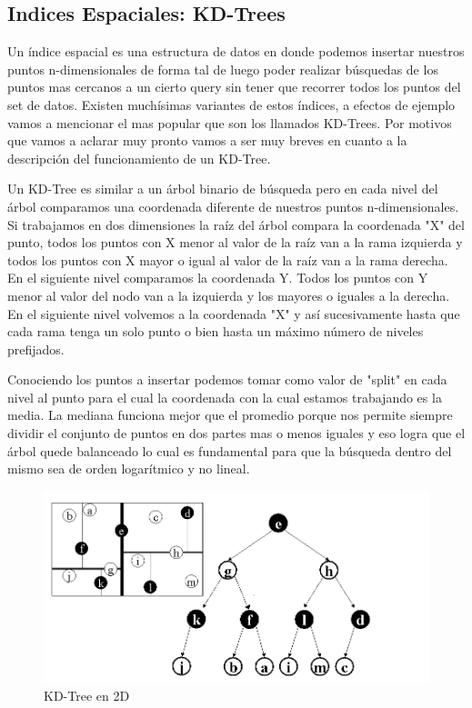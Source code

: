 \subsection{Indices Espaciales: KD-Trees}

Un índice espacial es una estructura de datos en donde podemos insertar nuestros puntos n-dimensionales de forma tal de luego poder realizar búsquedas de los puntos mas cercanos a un cierto query sin tener que recorrer todos los puntos del set de datos. Existen muchísimas variantes de estos índices, a efectos de ejemplo vamos a mencionar el mas popular que son los llamados KD-Trees. Por motivos que vamos a aclarar muy pronto vamos a ser muy breves en cuanto a la descripción del funcionamiento de un KD-Tree.

Un KD-Tree es similar a un árbol binario de búsqueda pero en cada nivel del árbol comparamos una coordenada diferente de nuestros puntos n-dimensionales. Si trabajamos en dos dimensiones la raíz del árbol compara la coordenada "X" del punto, todos los puntos con X menor al valor de la raíz van a la rama izquierda y todos los puntos con X mayor o igual al valor de la raíz van a la rama derecha. En el siguiente nivel comparamos la coordenada Y. Todos los puntos con Y menor al valor del nodo van a la izquierda y los mayores o iguales a la derecha. En el siguiente nivel volvemos a la coordenada "X" y así sucesivamente hasta que cada rama tenga un solo punto o bien hasta un máximo número de niveles prefijados.

Conociendo los puntos a insertar podemos tomar como valor de "split" en cada nivel al punto para el cual la coordenada con la cual estamos trabajando es la media. La mediana funciona mejor que el promedio porque nos permite siempre dividir el conjunto de puntos en dos partes mas o menos iguales y eso logra que el árbol quede balanceado lo cual es fundamental para que la búsqueda dentro del mismo sea de orden logarítmico y no lineal.

\begin{figure}[!htb]
\centering
\includegraphics[width=5in]{figures/kdtree-fig.png}

\caption{KD-Tree en 2D}
\label{fig:kdtree2d}
\end{figure}

